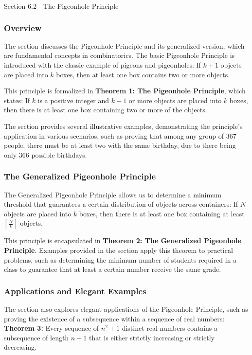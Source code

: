\begin{notes}{Section 6.2 - The Pigeonhole Principle}
    \subsubsection*{Overview}

    The section discusses the Pigeonhole Principle and its generalized version, which are fundamental concepts in combinatorics. The basic Pigeonhole Principle is introduced with the classic example 
    of pigeons and pigeonholes: If $k+1$ objects are placed into $k$ boxes, then at least one box contains two or more objects.
    
    This principle is formalized in \textbf{Theorem 1: The Pigeonhole Principle}, which states: If $k$ is a positive integer and $k+1$ or more objects are placed into $k$ boxes, then there is at least 
    one box containing two or more of the objects.
    
    The section provides several illustrative examples, demonstrating the principle's application in various scenarios, such as proving that among any group of 367 people, there must be at least two 
    with the same birthday, due to there being only 366 possible birthdays. \vspace*{1em}
    
    \subsubsection*{The Generalized Pigeonhole Principle}
    The Generalized Pigeonhole Principle allows us to determine a minimum threshold that guarantees a certain distribution of objects across containers: If $N$ objects are placed into $k$ boxes, then 
    there is at least one box containing at least $\left\lceil \frac{N}{k} \right\rceil$ objects.
    
    This principle is encapsulated in \textbf{Theorem 2: The Generalized Pigeonhole Principle}. Examples provided in the section apply this theorem to practical problems, such as determining the 
    minimum number of students required in a class to guarantee that at least a certain number receive the same grade. \vspace*{1em}
    
    \subsubsection*{Applications and Elegant Examples}
    The section also explores elegant applications of the Pigeonhole Principle, such as proving the existence of a subsequence within a sequence of real numbers: \textbf{Theorem 3:} Every sequence 
    of $n^2 + 1$ distinct real numbers contains a subsequence of length $n + 1$ that is either strictly increasing or strictly decreasing.
    

\end{notes}
